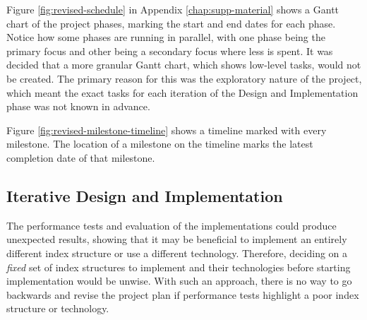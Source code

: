 Figure \ref{fig:revised-schedule} in Appendix \ref{chap:supp-material} shows a Gantt chart of the project phases, marking the start and end dates for each phase. Notice how some phases are running in parallel, with one phase being the primary focus and other being a secondary focus where less is spent. It was decided that a more granular Gantt chart, which shows low-level tasks, would not be created. The primary reason for this was the exploratory nature of the project, which meant the exact tasks for each iteration of the Design and Implementation phase was not known in advance.

Figure \ref{fig:revised-milestone-timeline} shows a timeline marked with every milestone. The location of a milestone on the timeline marks the latest completion date of that milestone.

\subsection{Iterative Design and Implementation}
\label{sec:iterative-d-and-i}

The performance tests and evaluation of the implementations could produce unexpected results, showing that it may be beneficial to implement an entirely different index structure or use a different technology. Therefore, deciding on a \textit{fixed} set of index structures to implement and their technologies before starting implementation would be unwise. With such an approach, there is no way to go backwards and revise the project plan if performance tests highlight a poor index structure or technology.

